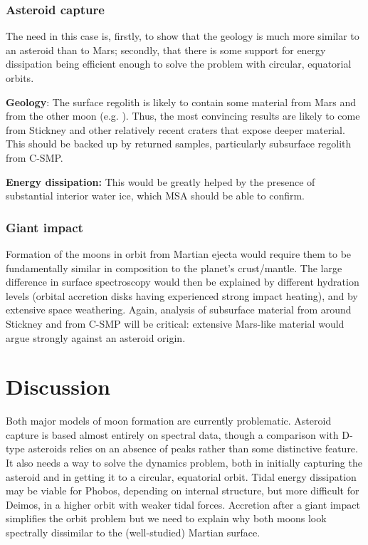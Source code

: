\subsubsection{Asteroid capture}

The need in this case is, firstly, to show that the geology is much more similar to an asteroid than to Mars; secondly, that there is some support for energy dissipation being efficient enough to solve the problem with circular, equatorial orbits.

\textbf{Geology}: The surface regolith is likely to contain some material from Mars and from the other moon (e.g. \citet{nayak_effects_2016}). Thus, the most convincing results are likely to come from Stickney and other relatively recent craters that expose deeper material. This should be backed up by returned samples, particularly subsurface regolith from C-SMP.

\textbf{Energy dissipation:} This would be greatly helped by the presence of substantial interior water ice, which MSA should be able to confirm.

\subsubsection{Giant impact}

Formation of the moons in orbit from Martian ejecta would require them to be fundamentally similar in composition to the planet's crust/mantle. The large difference in surface spectroscopy would then be explained by different hydration levels (orbital accretion disks having experienced strong impact heating), and by extensive space weathering. Again, analysis of subsurface material from around Stickney and from C-SMP will be critical: extensive Mars-like material would argue strongly against an asteroid origin.

\section{Discussion}\label{section:discussion}

Both major models of moon formation are currently problematic. Asteroid capture is based almost entirely on spectral data, though a comparison with D-type asteroids relies on an absence of peaks rather than some distinctive feature. It also needs a way to solve the dynamics problem, both in initially capturing the asteroid and in getting it to a circular, equatorial orbit. Tidal energy dissipation may be viable for Phobos, depending on internal structure, but more difficult for Deimos, in a higher orbit with weaker tidal forces. Accretion after a giant impact simplifies the orbit problem but we need to explain why both moons look spectrally dissimilar to the (well-studied) Martian surface.

